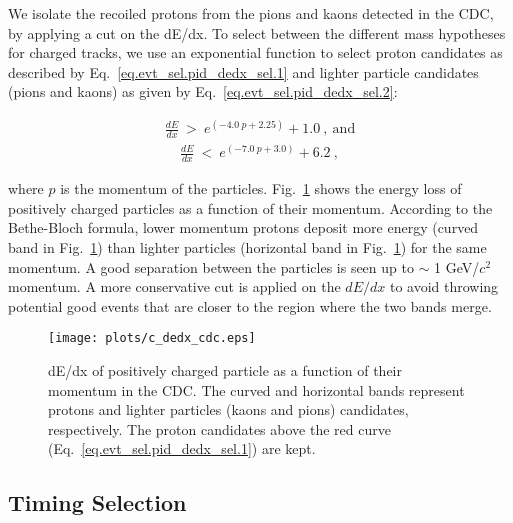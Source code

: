 We isolate the recoiled protons from the pions and kaons detected in the CDC, by applying a cut on the dE/dx. To select between the different mass hypotheses for charged tracks, we use an exponential function to select proton candidates as described by Eq.~\ref{eq.evt_sel.pid_dedx_sel.1} and lighter particle candidates (pions and kaons) as given by Eq.~\ref{eq.evt_sel.pid_dedx_sel.2}:

\begin{equation}
    \begin{aligned}
        \label{eq.evt_sel.pid_dedx_sel.1}
        \frac{dE}{dx}~>~e^{(-4.0~p + 2.25)} + 1.0~,~\mathrm{and}
    \end{aligned}
\end{equation}
\begin{equation}
    \begin{aligned}
        \label{eq.evt_sel.pid_dedx_sel.2}
        \frac{dE}{dx}~<~e^{(-7.0~p + 3.0)} + 6.2~,
    \end{aligned}
\end{equation}

where $p$ is the momentum of the particles.
Fig.~\ref{fig.evt_sel.pid_dedx_sel} shows the energy loss of positively charged particles as a function of their momentum. According to the Bethe-Bloch formula, lower momentum protons deposit more energy (curved band in Fig.~\ref{fig.evt_sel.pid_dedx_sel}) than lighter particles (horizontal band in Fig.~\ref{fig.evt_sel.pid_dedx_sel}) for the same momentum. A good separation between the particles is seen up to $\sim$ 1 GeV/$c^{2}$ momentum. A more conservative cut is applied on the $dE/dx$ to avoid throwing potential good events that are closer to the region where the two bands merge.

\begin{figure}[H]
    \centering
        \texttt{[image: plots/c\_dedx\_cdc.eps]}
        \caption{dE/dx of positively charged particle as a function of their momentum in the CDC. The curved and horizontal bands represent protons and lighter particles (kaons and pions) candidates, respectively. The proton candidates above the red curve (Eq.~\ref{eq.evt_sel.pid_dedx_sel.1}) are kept.}
        \label{fig.evt_sel.pid_dedx_sel}
\end{figure}

\subsection{Timing Selection}
\label{sec.evt_sel.pid_tim_sel}


